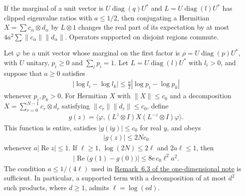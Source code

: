 \begin{theorem}
    \label{thm:filter_energy_term}
    \leanok
    If the marginal of a unit vector is $U\operatorname{diag}(q)U^*$ and
    $L=U\operatorname{diag}(l)U^*$ has clipped eigenvalue ratios with $a\le1/2$,
    then conjugating a Hermitian $X=\sum c_\alpha\otimes d_\alpha$ by
    $L\otimes1$ changes the real part of its expectation by at most
    $4a^2\sum\lVert c_\alpha\rVert\lVert d_\alpha\rVert$. Operators supported on
    disjoint regions commute.

    Let $\varphi$ be a unit vector whose marginal on the first factor is
    $\rho=U\operatorname{diag}(p)U^*$, with $U$ unitary, $p_i\ge0$ and
    $\sum_i p_i=1$. Let $L=U\operatorname{diag}(l)U^*$ with $l_i>0$, and
    suppose that $a\ge0$ satisfies
    \begin{align*}
        |\log l_i-\log l_k|\le\frac a2|\log p_i-\log p_k|
    \end{align*}
    whenever $p_i,p_k>0$. For Hermitian $X$ with $\|X\|\le c_0$ and a
    decomposition $X=\sum_{r=0}^{N-1} c_r\otimes d_r$ satisfying
    $\|c_r\|\|d_r\|\le c_0$, define
    \begin{align*}
        g(z)=\langle\varphi,(L^z\otimes I)X(L^{-z}\otimes I)\varphi\rangle.
    \end{align*}
    This function is entire, satisfies $|g(\mathrm iy)|\le c_0$ for real
    $y$, and obeys
    \begin{align*}
        |g(z)|\le2Nc_0
    \end{align*}
    whenever $a|\operatorname{Re}z|\le1$. If $\ell\ge1$,
    $\log(2N)\le2\ell$ and $2a\ell\le1$, then
    \begin{align*}
        \bigl|\operatorname{Re}\bigl(g(1)-g(0)\bigr)\bigr|
        \le8\mathrm e\,c_0\ell^2a^2.
    \end{align*}
    The condition $a\le1/(4\ell)$ used in
    \href{https://github.com/LionSR/TNLean/blob/67ea93e29f7c088f766b271208a2fde4cccf04a6/docs/notes/one_dimensional_note/part1_arealaw.tex#L711-L734}{Remark~6.3 of the one-dimensional note}
    is sufficient. In particular, a supported term with a decomposition of
    at most $d^2$ such products, where $d\ge1$, admits
    $\ell=\log(\mathrm e d)$.
\end{theorem}

